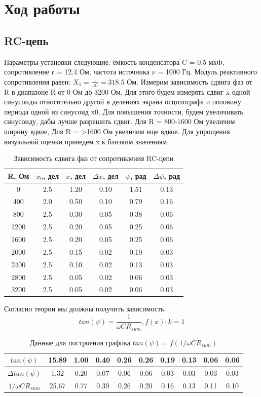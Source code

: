 \documentclass[a4paper, 12pt]{article}%
\begin{document}
	\section{Ход работы}
	\subsection{RC-цепь}
	Параметры установки следующие: ёмкость конденсатора C = 0.5 мкФ, сопротивление
	r = 12.4 Ом, частота источника $\nu$ = 1000 Гц. Модуль реактивного сопротивления равен: $X_1 = \frac{1}{\omega C} = 318.5$ Ом.
	Измерим зависимость сдвига фаз от R в диапазоне R от 0 Ом до 3200 Ом. Для этого будем
	измерять сдвиг x одной синусоиды относительно другой в делениях экрана осцилографа
	и половину периода одной из синусоид x0. Для повышения точности, будем увеличивать синусоиду, дабы лучше разрешить сдвиг. Для R = 800-1600 Ом увеличим ширину вдвое, Для R = >1600 Ом увеличим еще вдвое. Для упрощения визуальной оценки приведем x к близким значениям.
	\begin{table}[H]
		\centering
		\begin{tabular}{|c|c|c|c|c|c|}
			\hline
			R, Ом & $x_0$, дел & $x$, дел   & $\Delta x$, дел   & $\psi$, рад  & $\Delta \psi$, рад \\ \hline
			0     & 2.5 & 1.20 & 0.10 & 1.51 & 0.13 \\ \hline
			400   & 2.0 & 0.50 & 0.10 & 0.79 & 0.16 \\ \hline
			800   & 2.5 & 0.30 & 0.05 & 0.38 & 0.06 \\ \hline
			1200  & 2.5 & 0.20 & 0.05 & 0.25 & 0.06 \\ \hline
			1600  & 2.5 & 0.20 & 0.05 & 0.25 & 0.06 \\ \hline
			2000  & 2.5 & 0.15 & 0.02 & 0.19 & 0.03 \\ \hline
			2400  & 2.5 & 0.10 & 0.02 & 0.13 & 0.03 \\ \hline
			2800  & 2.5 & 0.05 & 0.02 & 0.06 & 0.03 \\ \hline
			3200  & 2.5 & 0.05 & 0.02 & 0.06 & 0.03 \\ \hline
		\end{tabular}
		\caption{Зависимость сдвига фаз от сопротивления RC-цепи}
	\end{table}
	Согласно теории мы должны получить зависимость:
		\begin{equation*}
			 tan(\psi) = \frac{1}{\omega C R_{sum}}, f(x): k = 1
		\end{equation*}	
	\begin{table}[H]
		\centering
		\begin{tabular}{|c|c|c|c|c|c|c|c|c|c|}
			\hline
			$tan(\psi)$   & 15.89 & 1.00 & 0.40 & 0.26 & 0.26 & 0.19 & 0.13 & 0.06 & 0.06 \\ \hline
			$\Delta tan(\psi)$  & 1.32  & 0.20 & 0.07 & 0.06 & 0.06 & 0.03 & 0.03 & 0.03 & 0.03 \\ \hline
			$1/\omega C R_{sum}$ & 25.67 & 0.77 & 0.39 & 0.26 & 0.20 & 0.16 & 0.13 & 0.11 & 0.10 \\ \hline
		\end{tabular}
		\caption{Данные для построения графика $tan(\psi) = f(1/\omega C R_{sum})$}
	\end{table}
\end{document}
